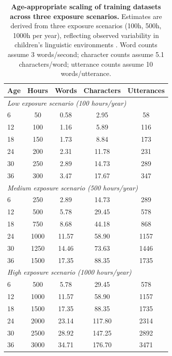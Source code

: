 \begin{table}[ht]
\centering
\small
\begin{tabular}{l c c c c}
\toprule
\textbf{Age} & \textbf{Hours} & \textbf{Words} & \textbf{Characters} & \textbf{Utterances} \\

\midrule
\multicolumn{5}{l}{\textit{Low exposure scenario (100 hours/year)}} \\
\midrule
6   & 50   & 0.58  & 2.95  & 58   \\
12  & 100  & 1.16  & 5.89  & 116  \\
18  & 150  & 1.73  & 8.84  & 173  \\
24  & 200  & 2.31  & 11.78 & 231  \\
30  & 250  & 2.89  & 14.73 & 289  \\
36  & 300  & 3.47  & 17.67 & 347  \\
\midrule
\multicolumn{5}{l}{\textit{Medium exposure scenario (500 hours/year)}} \\
\midrule
6   & 250  & 2.89  & 14.73 & 289  \\
12  & 500  & 5.78  & 29.45 & 578  \\
18  & 750  & 8.68  & 44.18 & 868  \\
24  & 1000 & 11.57 & 58.90 & 1157 \\
30  & 1250 & 14.46 & 73.63 & 1446 \\
36  & 1500 & 17.35 & 88.35 & 1735 \\
\midrule
\multicolumn{5}{l}{\textit{High exposure scenario (1000 hours/year)}} \\
\midrule
6   & 500  & 5.78  & 29.45 & 578  \\
12  & 1000 & 11.57 & 58.90 & 1157 \\
18  & 1500 & 17.35 & 88.35 & 1735 \\
24  & 2000 & 23.14 & 117.80 & 2314 \\
30  & 2500 & 28.92 & 147.25 & 2892 \\
36  & 3000 & 34.71 & 176.70 & 3471 \\
\bottomrule
\end{tabular}
\caption{\textbf{Age-appropriate scaling of training datasets across three exposure scenarios.} Estimates are derived from three exposure scenarios (100h, 500h, 1000h per year), reflecting observed variability in children’s linguistic environments \citep{cristia2019child}. Word counts assume 3 words/second; character counts assume 5.1 characters/word; utterance counts assume 10 words/utterance.}
\label{tab:train}
\end{table}


